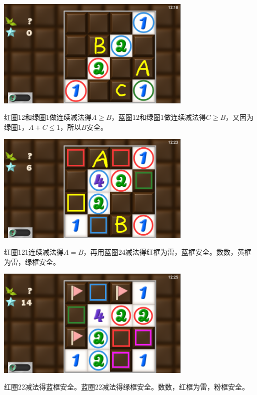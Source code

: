 \subsection{} %
\begin{center}
    \includegraphics[width=0.7\textwidth]{puzzle/172-1.png}
\end{center}
红圈12和绿圈1做连续减法得$A\ge B$，蓝圈12和绿圈1做连续减法得$C\ge B$，又因为绿圈1，$A+C\le 1$，所以$B$安全。
\begin{center}
    \includegraphics[width=0.7\textwidth]{puzzle/172-2.png}
\end{center}
红圈121连续减法得$A=B$，再用蓝圈24减法得红框为雷，蓝框安全。数数，黄框为雷，绿框安全。
\begin{center}
    \includegraphics[width=0.7\textwidth]{puzzle/172-3.png}
\end{center}
红圈22减法得蓝框安全。蓝圈22减法得绿框安全。数数，红框为雷，粉框安全。

